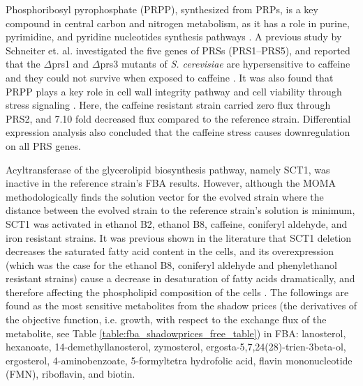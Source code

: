 Phosphoribosyl pyrophosphate (PRPP), synthesized from PRPs, is a key compound in central carbon and nitrogen metabolism, as it has a role in purine, pyrimidine, and pyridine nucleotides synthesis pathways \cite{jimenez2008phosphoribosyl}. A previous study by Schneiter et. al. investigated the five genes of PRSs (PRS1–PRS5), and reported that the $\Delta$prs1 and $\Delta$prs3 mutants of \emph{S. cerevisiae} are hypersensitive to caffeine and they could not survive when exposed to caffeine \cite{schneiter2000importance}. It was also found that PRPP plays a key role in cell wall integrity pathway and cell viability through stress signaling \cite{ugbogu2013contribution}. Here, the caffeine resistant strain carried zero flux through PRS2, and 7.10 fold decreased flux compared to the reference strain. Differential expression analysis also concluded that the caffeine stress causes downregulation on all PRS genes.

Acyltransferase of the glycerolipid biosynthesis pathway, namely SCT1, was inactive in the reference strain's FBA results. However, although the MOMA methodologically finds the solution vector for the evolved strain where the distance between the evolved strain to the reference strain's solution is minimum, SCT1 was activated in ethanol B2, ethanol B8, caffeine, coniferyl aldehyde, and iron resistant strains. It was previous shown in the literature that SCT1 deletion decreases the saturated fatty acid content in the cells, and its overexpression (which was the case for the ethanol B8, coniferyl aldehyde and phenylethanol resistant strains) cause a decrease in desaturation of fatty acids dramatically, and therefore affecting the phospholipid composition of the cells \cite{de2012yeast}. The followings are found as the most sensitive metabolites from the shadow prices (the derivatives of the objective function, i.e. growth, with respect to the exchange flux of the metabolite, see Table \ref{table:fba_shadowprices_free_table}) in FBA: lanosterol, hexanoate, 14-demethyllanosterol, zymosterol, ergosta-5,7,24(28)-trien-3beta-ol, ergosterol, 4-aminobenzoate, 5-formyltetra hydrofolic acid, flavin mononucleotide (FMN), riboflavin, and biotin.

